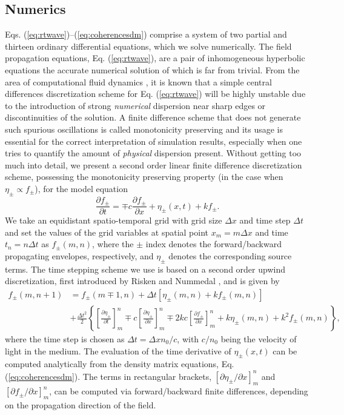 \documentclass[10pt]{article}
\begin{document}
\begin{appendices}
\section{Numerics}
\label{sec:numerics}
Eqs. (\ref{eq:rtwave})--(\ref{eq:coherencesdm}) comprise a system of two partial and thirteen ordinary
differential equations, which we solve numerically. The field propagation equations, Eq. (\ref{eq:rtwave}), are a pair of
inhomogeneous hyperbolic equations the accurate numerical solution of which is
far from trivial. From the area of computational fluid dynamics
\cite{wesseling2009principles}, it is known that a simple central differences
discretization scheme for Eq. (\ref{eq:rtwave}) will be highly unstable due to
the introduction of strong \emph{numerical} dispersion near sharp edges or
discontinuities of the solution. A finite difference scheme that does not
generate such spurious oscillations is called monotonicity preserving
\cite{wesseling2009principles} and its usage is essential for the correct
interpretation of simulation results, especially when one tries to quantify
the amount of \emph{physical} dispersion present. Without getting too much
into detail, we present a second order linear finite difference discretization
scheme, possessing the monotonicity preserving property (in the case when
$\eta_{\pm}\propto f_{\pm}$), for the model equation
\begin{equation}
	\frac{\partial f_{\pm}}{\partial t}=\mp c\frac{\partial f_{\pm}}{\partial
		x}+\eta_{\pm}(x,t)+kf_{\pm}.\label{eq:genericwave}%
\end{equation}
We take an equidistant spatio-temporal grid with grid size $\Delta x$ and time
step $\Delta t$ and set the values of the grid variables at spatial point
$x_{m}=m\Delta x$ and time $t_{n}=n\Delta t$ as $f_{\pm}(m,n)$, where the
$\pm$ index denotes the forward/backward propagating envelopes, respectively, and $\eta_{\pm}$ denotes the corresponding source terms. The time stepping scheme we use is based on a second order upwind
discretization, first introduced by Risken and Nummedal \cite{risken1968self},
and is given by
\begin{align}
	f_{\pm}(m,n+1) &  =f_{\pm}(m\mp1,n)+\Delta t\left[  \eta_{\pm}(m,n)+kf_{\pm
	}(m,n)\right]  \nonumber\label{eq:riskennummedal}\\
	&  +\frac{\Delta t^{2}}{2}\left\{  \left[  \frac{\partial \eta_{\pm}}{\partial
		t}\right]  _{m}^{n}\mp c\left[  \frac{\partial \eta_{\pm}}{\partial x}\right]
	_{m}^{n}\mp2kc\left[  \frac{\partial f_{\pm}}{\partial x}\right]  _{m}%
	^{n}+k\eta_{\pm}(m,n)+k^{2}f_{\pm}(m,n)\right\}  ,
\end{align}
where the time step is chosen as $\Delta t=\Delta xn_{0}/c$, with $c/n_{0}$
being the velocity of light in the medium. The evaluation of the time
derivative of $\eta_{\pm}(x,t)$ can be computed analytically from the density matrix
equations, Eq. (\ref{eq:coherencesdm}). The terms in rectangular brackets, $\left[
\partial \eta_{\pm}/\partial x\right]  _{m}^{n}$ and $\left[  \partial f_{\pm
}/\partial x\right]  _{m}^{n}$, can be computed via forward/backward
finite differences, depending on the propagation direction of the field. 


\end{appendices}
\end{document}
